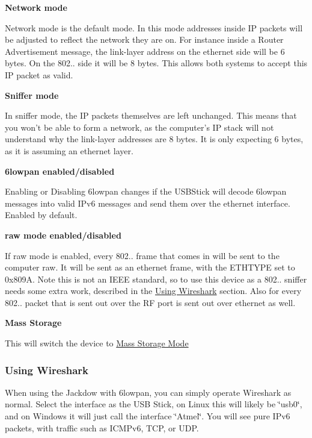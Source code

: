 {\bfseries \-Network mode}\par
 \-Network mode is the default mode. \-In this mode addresses inside \-I\-P packets will be adjusted to reflect the network they are on. \-For instance inside a \-Router \-Advertisement message, the link-\/layer address on the ethernet side will be 6 bytes. \-On the 802.. side it will be 8 bytes. \-This allows both systems to accept this \-I\-P packet as valid.

{\bfseries \-Sniffer mode}\par
 \-In sniffer mode, the \-I\-P packets themselves are left unchanged. \-This means that you won't be able to form a network, as the computer's \-I\-P stack will not understand why the link-\/layer addresses are 8 bytes. \-It is only expecting 6 bytes, as it is assuming an ethernet layer.

{\bfseries 6lowpan enabled/disabled}\par
 \-Enabling or \-Disabling 6lowpan changes if the \-U\-S\-B\-Stick will decode 6lowpan messages into valid \-I\-Pv6 messages and send them over the ethernet interface. \-Enabled by default.

{\bfseries raw mode enabled/disabled}\par
 \-If raw mode is enabled, every 802.. frame that comes in will be sent to the computer raw. \-It will be sent as an ethernet frame, with the \-E\-T\-H\-T\-Y\-P\-E set to 0x809\-A. \-Note this is not an \-I\-E\-E\-E standard, so to use this device as a 802.. sniffer needs some extra work, described in the \hyperlink{a00053_Wireshark}{\-Using \-Wireshark} section. \-Also for every 802.. packet that is sent out over the \-R\-F port is sent out over ethernet as well.

{\bfseries \-Mass \-Storage}\par
 \-This will switch the device to \hyperlink{a00053_MassStorageMode}{\-Mass \-Storage \-Mode}\hypertarget{a00053_Wireshark}{}\subsubsection{\-Using Wireshark}\label{a00053_Wireshark}
\-When using the \-Jackdow with 6lowpan, you can simply operate \-Wireshark as normal. \-Select the interface as the \-U\-S\-B \-Stick, on \-Linux this will likely be \char`\"{}usb0\char`\"{}, and on \-Windows it will just call the interface \char`\"{}\-Atmel\char`\"{}. \-You will see pure \-I\-Pv6 packets, with traffic such as \-I\-C\-M\-Pv6, \-T\-C\-P, or \-U\-D\-P.


